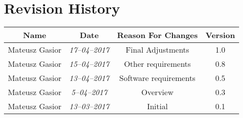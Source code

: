 \chapter*{Revision History}

\begin{center}
    \begin{tabular}{|c|c|c|c|}
        \hline
	    Name & Date & Reason For Changes & Version\\
        \hline
	    Mateusz Gasior & \emph{17--04--2017} & Final Adjustments & 1.0 \\ \hline
	    Mateusz Gasior & \emph{15--04--2017} & Other requirements & 0.8 \\ \hline
 	    Mateusz Gasior & \emph{13--04--2017} & Software requirements & 0.5 \\ \hline
 	    Mateusz Gasior & \emph{5--04--2017} & Overview & 0.3 \\ \hline
 	    Mateusz Gasior & \emph{13--03--2017} & Initial & 0.1 \\ \hline
        \hline
    \end{tabular}
\end{center}